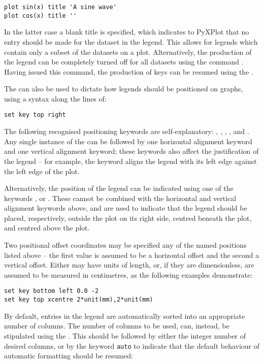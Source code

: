\begin{verbatim}
plot sin(x) title 'A sine wave'
plot cos(x) title ''
\end{verbatim}

In the latter case a blank title is specified, which indicates to PyXPlot that
no entry should be made for the dataset in the legend. This allows for legends
which contain only a subset of the datasets on a plot. Alternatively, the
production of the legend can be completely turned off for all datasets using
the command . Having issued this command, the production of
keys can be resumed using the .

The  can also be used to dictate how legends should be
positioned on graphs, using a syntax along the lines of:

\begin{verbatim}
set key top right
\end{verbatim}

The following recognised positioning keywords are self-explanatory:
, , , ,
 and . Any single instance of the
 can be followed by one horizontal alignment keyword and one
vertical alignment keyword; these keywords also affect the justification of the
legend -- for example, the keyword  aligns the legend with its
left edge against the left edge of the plot.

Alternatively, the position of the legend can be indicated using one of the
keywords ,  or . These cannot be
combined with the horizontal and vertical alignment keywords above, and are
used to indicate that the legend should be placed, respectively, outside the
plot on its right side, centred beneath the plot, and centred above the plot.

Two positional offset coordinates may be specified any of the named positions
listed above -- the first value is assumed to be a horizontal offset and the
second a vertical offset. Either may have units of length, or, if they are
dimensionless, are assumed to be measured in centimetres, as the following
examples demonstrate:

\begin{verbatim}
set key bottom left 0.0 -2
set key top xcentre 2*unit(mm),2*unit(mm)
\end{verbatim}

By default, entries in the legend are automatically sorted into an appropriate
number of columns. The number of columns to be used, can, instead, be
stipulated using the . This should be followed by
either the integer number of desired columns, or by the keyword {\tt auto} to
indicate that the default behaviour of automatic formatting should be resumed:

